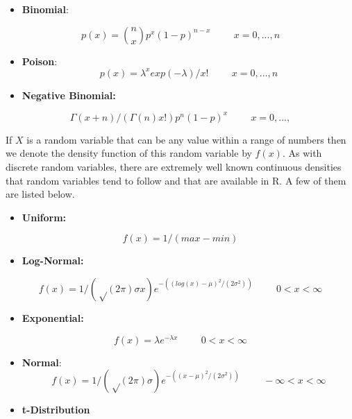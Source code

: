 \documentclass[
]{book}
\providecommand{\tightlist}{%
  \setlength{\itemsep}{0pt}\setlength{\parskip}{0pt}}
\begin{document}
\begin{itemize}
\tightlist
\item
  \textbf{Binomial}:
\end{itemize}

\[p(x) = \binom{n}{x} p^x (1-p)^{n-x} \hspace{1cm} x = 0, ..., n\]

\begin{itemize}
\item
  \textbf{Poison}:
  \[p(x) = λ^x exp(-λ)/x! \hspace{1cm} x = 0, ..., n\]
\item
  \textbf{Negative Binomial:}
\end{itemize}

\[Γ(x+n)/(Γ(n) x!) p^n (1-p)^x   \hspace{1cm} x = 0, ..., \]

If \(X\) is a random variable that can be any value within a range of numbers then we denote the density function of this random variable by \(f(x)\). As with discrete random variables, there are extremely well known continuous densities that random variables tend to follow and that are available in R. A few of them are listed below.

\begin{itemize}
\tightlist
\item
  \textbf{Uniform:}
\end{itemize}

\[f(x) = 1/(max-min)\]

\begin{itemize}
\tightlist
\item
  \textbf{Log-Normal:}
\end{itemize}

\[f(x) = 1/(√(2 π) σ x) e^{-((log{(x)} - μ)^2 / (2 σ^2))} \hspace{1cm} 0 <x < \infty\]

\begin{itemize}
\tightlist
\item
  \textbf{Exponential:}
\end{itemize}

\[f(x) = λ {e}^{- λ x} \hspace{1cm} 0 <x < \infty\]

\begin{itemize}
\item
  \textbf{Normal}:
  \[f(x) = 1/(√(2 π) σ) e^{-((x - μ)^2/(2 σ^2))} \hspace{1cm} -\infty <x < \infty\]
\item
  \textbf{t-Distribution}
\end{itemize}
\end{document}
